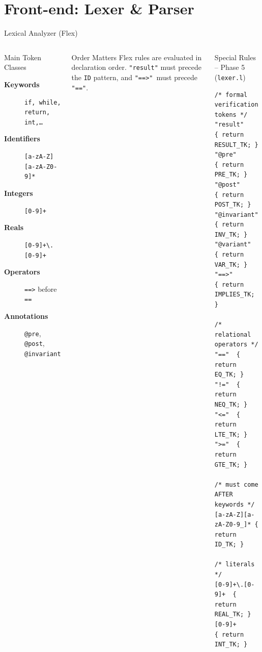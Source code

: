 \documentclass[aspectratio=169,11pt]{beamer}
\begin{document}
\section{Front-end: Lexer \& Parser}

\begin{frame}[fragile]{Lexical Analyzer (Flex)}
\begin{columns}[t]
  \begin{block}{Main Token Classes}\small
    \begin{description}
      \item[\textbf{Keywords}] \texttt{if, while, return, int,\ldots}
      \item[\textbf{Identifiers}] \texttt{[a-zA-Z][a-zA-Z0-9]*}
      \item[\textbf{Integers}] \texttt{[0-9]+}
      \item[\textbf{Reals}] \texttt{[0-9]+\textbackslash.[0-9]+}
      \item[\textbf{Operators}] \texttt{==>} before \texttt{==}
      \item[\textbf{Annotations}] \texttt{@pre}, \texttt{@post}, \texttt{@invariant}
    \end{description}
  \end{block}
  \begin{alertblock}{Order Matters}
    \small Flex rules are evaluated in declaration order.
    \texttt{"result"} must precede the \texttt{ID} pattern, and
    \texttt{"==>"}\ must precede \texttt{"=="}.
  \end{alertblock}

  \begin{exampleblock}{Special Rules -- Phase 5 (\texttt{lexer.l})}
\begin{lstlisting}[style=cppslide]
/* formal verification tokens */
"result"     { return RESULT_TK; }
"@pre"       { return PRE_TK; }
"@post"      { return POST_TK; }
"@invariant" { return INV_TK; }
"@variant"   { return VAR_TK; }
"==>"        { return IMPLIES_TK; }

/* relational operators */
"=="  { return EQ_TK; }
"!="  { return NEQ_TK; }
"<="  { return LTE_TK; }
">="  { return GTE_TK; }

/* must come AFTER keywords */
[a-zA-Z][a-zA-Z0-9_]* { return ID_TK; }

/* literals */
[0-9]+\.[0-9]+  { return REAL_TK; }
[0-9]+          { return INT_TK; }
\end{lstlisting}
  \end{exampleblock}
\end{columns}
\end{frame}
\end{document}
